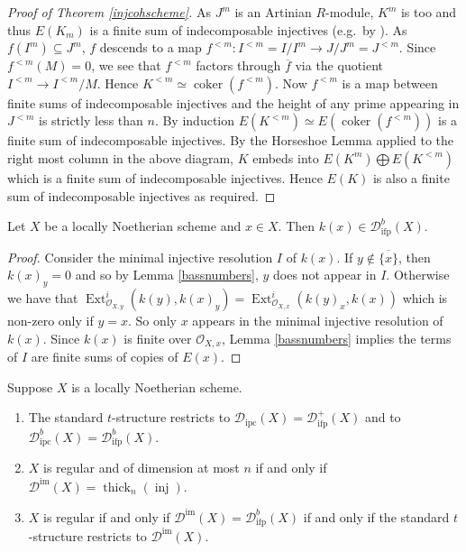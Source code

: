 \documentclass[12pt,oneside]{amsart}
\DeclareMathOperator*{\coker}{coker}
\DeclareMathOperator{\thick}{thick}
\DeclareMathOperator{\Ext}{Ext}
\DeclareMathOperator{\inj}{inj}
\DeclareMathOperator{\immac}{im}
\DeclareMathOperator{\ipscoh}{ipc}
\DeclareMathOperator{\ifp}{ifp}
\begin{document}
\begin{proof}[Proof of Theorem \ref{injcohscheme}]
As $J^m$ is an Artinian $R$-module, $K^m$ is too and thus $E(K_m)$ is a finite sum of indecomposable injectives (e.g.\ by \cite[Theorem 3.4.3]{EJ11}). As $f(I^m) \subseteq J^m$, $f$ descends to a map $f^{<m}:  I^{<m} = I/I^m \to  J/J^m = J^{<m}$. Since $f^{<m}(M) = 0$, we see that $f^{<m}$ factors through $\overline{f}$ via the quotient $I^{<m} \to I^{<m}/M$. Hence $K^{<m} \simeq \coker(f^{<m})$. Now $f^{<m}$ is a map between finite sums of indecomposable injectives and the height of any prime appearing in $J^{<m}$ is strictly less than $n$. By induction $E(K^{<m}) \simeq E(\coker(f^{<m}))$ is a finite sum of indecomposable injectives. By the Horseshoe Lemma applied to the right most column in the above diagram, $K$ embeds into $E(K^m) \bigoplus E(K^{<m})$ which is a finite sum of indecomposable injectives. Hence $E(K)$ is also a finite sum of indecomposable injectives as required. 
\end{proof}

\begin{lemma}\label{residueifp}
Let $X$ be a locally Noetherian scheme and $x \in X$. Then $k(x) \in \mathcal{D}^b_{\ifp}(X)$. 
\end{lemma}

\begin{proof}
Consider the minimal injective resolution $I$ of $k(x)$. If $y \not\in \overline{\{x\}}$, then $k(x)_y = 0$ and so by Lemma \ref{bassnumbers}, $y$ does not appear in $I$. Otherwise we have that $\Ext^i_{\mathcal{O}_{X,y}}(k(y),k(x)_y) = \Ext^i_{\mathcal{O}_{X,x}}(k(y)_x,k(x))$ which is non-zero only if $y = x$.  So only $x$ appears in the minimal injective resolution of $k(x)$. Since $k(x)$ is finite over $\mathcal{O}_{X,x}$, Lemma \ref{bassnumbers} implies the terms of $I$ are finite sums of copies of $E(x)$. 
\end{proof}


\begin{theorem} \label{regularscheme}
Suppose $X$ is a locally Noetherian scheme. 
\begin{enumerate}
\item The standard $t$-structure restricts to $\mathcal{D}_{\ipscoh}(X) = \mathcal{D}^+_{\ifp}(X)$ and to $\mathcal{D}^b_{\ipscoh}(X) = \mathcal{D}^b_{\ifp}(X)$.

\item $X$ is regular and of dimension at most $n$ if and only if $\mathcal{D}^{\immac}(X) = \thick_n(\inj)$. 

\item $X$ is regular if and only if $\mathcal{D}^{\immac}(X) = \mathcal{D}^b_{\ifp}(X)$ if and only if the standard $t$-structure restricts to $\mathcal{D}^{\immac}(X)$.
\end{enumerate}
\end{theorem}
\end{document}
